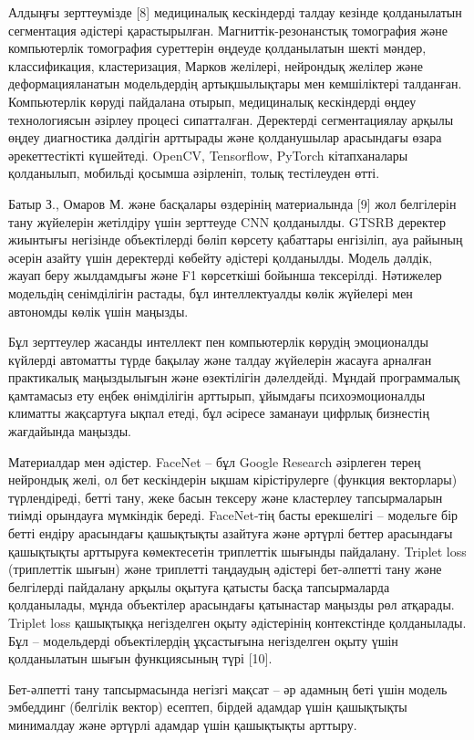 \begin{multicols}{2}
Алдыңғы зерттеумізде {[}8{]} медициналық кескіндерді талдау кезінде
қолданылатын сегментация әдістері қарастырылған. Магниттік-резонанстық
томография және компьютерлік томография суреттерін өңдеуде қолданылатын
шекті мәндер, классификация, кластеризация, Марков желілері, нейрондық
желілер және деформацияланатын модельдердің артықшылықтары мен
кемшіліктері талданған. Компьютерлік көруді пайдалана отырып,
медициналық кескіндерді өңдеу технологиясын әзірлеу процесі сипатталған.
Деректерді сегментациялау арқылы өңдеу диагностика дәлдігін арттырады
және қолданушылар арасындағы өзара әрекеттестікті күшейтеді. OpenCV,
Tensorflow, PyTorch кітапханалары қолданылып, мобильді қосымша
әзірленіп, толық тестілеуден өтті.

Батыр З., Омаров М. және басқалары өздерінің материалында {[}9{]} жол
белгілерін тану жүйелерін жетілдіру үшін зерттеуде CNN қолданылды. GTSRB
деректер жиынтығы негізінде объектілерді бөліп көрсету қабаттары
енгізіліп, ауа райының әсерін азайту үшін деректерді көбейту әдістері
қолданылды. Модель дәлдік, жауап беру жылдамдығы және F1 көрсеткіші
бойынша тексерілді. Нәтижелер модельдің сенімділігін растады, бұл
интеллектуалды көлік жүйелері мен автономды көлік үшін маңызды.

Бұл зерттеулер жасанды интеллект пен компьютерлік көрудің эмоционалды
күйлерді автоматты түрде бақылау және талдау жүйелерін жасауға арналған
практикалық маңыздылығын және өзектілігін дәлелдейді. Мұндай
программалық қамтамасыз ету еңбек өнімділігін арттырып, ұйымдағы
психоэмоционалды климатты жақсартуға ықпал етеді, бұл әсіресе заманауи
цифрлық бизнестің жағдайында маңызды.

Материалдар мен әдістер. FaceNet -- бұл Google Research
әзірлеген терең нейрондық желі, ол бет кескіндерін ықшам кірістірулерге
(функция векторлары) түрлендіреді, бетті тану, жеке басын тексеру және
кластерлеу тапсырмаларын тиімді орындауға мүмкіндік береді. FaceNet-тің
басты ерекшелігі -- модельге бір бетті ендіру арасындағы қашықтықты
азайтуға және әртүрлі беттер арасындағы қашықтықты арттыруға
көмектесетін триплеттік шығынды пайдалану. Triplet loss (триплеттік
шығын) және триплетті таңдаудың әдістері бет-әлпетті тану және
белгілерді пайдалану арқылы оқытуға қатысты басқа тапсырмаларда
қолданылады, мұнда объектілер арасындағы қатынастар маңызды рөл
атқарады. Triplet loss қашықтыққа негізделген оқыту әдістерінің
контекстінде қолданылады. Бұл -- модельдерді объектілердің ұқсастығына
негізделген оқыту үшін қолданылатын шығын функциясының түрі {[}10{]}.

Бет-әлпетті тану тапсырмасында негізгі мақсат -- әр адамның беті үшін
модель эмбеддинг (белгілік вектор) есептеп, бірдей адамдар үшін
қашықтықты минималдау және әртүрлі адамдар үшін қашықтықты арттыру.


\end{multicols}
